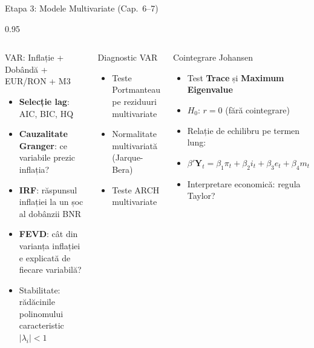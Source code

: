 \documentclass[9pt, aspectratio=169, t]{beamer}
\begin{document}
\begin{frame}{Etapa 3: Modele Multivariate (Cap.\ 6--7)}
    \vspace{-0.3cm}
    \begin{cminipage}{0.95\textwidth}
        {\scriptsize
        \begin{columns}[T]
            \begin{block}{VAR: Inflație + Dobândă + EUR/RON + M3}
                \begin{itemize}\setlength{\itemsep}{0pt}
                    \item \textbf{Selecție lag}: AIC, BIC, HQ
                    \item \textbf{Cauzalitate Granger}: ce variabile prezic inflația?
                    \item \textbf{IRF}: răspunsul inflației la un șoc al dobânzii BNR
                    \item \textbf{FEVD}: cât din varianța inflației e explicată de fiecare variabilă?
                    \item Stabilitate: rădăcinile polinomului caracteristic $|\lambda_i| < 1$
                \end{itemize}
            \end{block}

            \vspace{0.1cm}

            \begin{exampleblock}{Diagnostic VAR}
                \begin{itemize}\setlength{\itemsep}{0pt}
                    \item Teste Portmanteau pe reziduuri multivariate
                    \item Normalitate multivariată (Jarque-Bera)
                    \item Teste ARCH multivariate
                \end{itemize}
            \end{exampleblock}

            \begin{alertblock}{Cointegrare Johansen}
                \begin{itemize}\setlength{\itemsep}{0pt}
                    \item Test \textbf{Trace} și \textbf{Maximum Eigenvalue}
                    \item $H_0$: $r = 0$ (fără cointegrare)
                    \item Relație de echilibru pe termen lung:
                    \item[] $\beta' \mathbf{Y}_t = \beta_1 \pi_t + \beta_2 i_t + \beta_3 e_t + \beta_4 m_t$
                    \item Interpretare economică: regula Taylor?
                \end{itemize}
            \end{alertblock}


\end{columns}}
\end{cminipage}
\end{frame}
\end{document}
